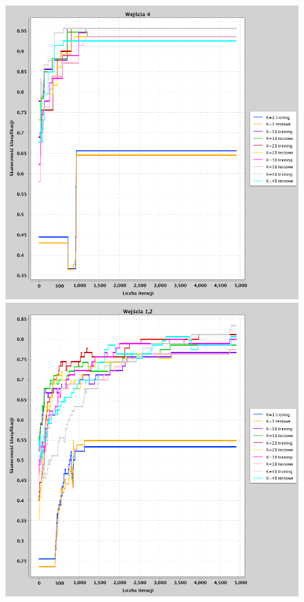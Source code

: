\documentclass[a4paper, portrait,11pt]{article}
\begin{document}
\begin{figure}[!htb]
  \begin{minipage}{0.33\textwidth}
    \centering
    \includegraphics[width=1\linewidth]{../data/classification4/1/1_4.png}
    \caption{\label{fig:41_1_4}}
  \end{minipage}
  \begin{minipage}{0.33\textwidth}
    \centering
    \includegraphics[width=1\linewidth]{../data/classification4/1/2_1,2.png}

\end{minipage}
\end{figure}
\end{document}
